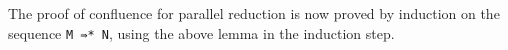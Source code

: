 \begin{fence}
\begin{code}
\AgdaSpace{}%
\AgdaSymbol{(}\AgdaSpace{}%
\AgdaSpace{}%
\AgdaSpace{}%
\AgdaSpace{}%
\AgdaSymbol{)}\<%
\\
\>[0][@{}l@{\AgdaIndent{0}}]%
\>[2]\AgdaSpace{}%
\AgdaSpace{}%
\AgdaSymbol{(}\AgdaSpace{}%
\AgdaSymbol{)}\AgdaSpace{}%
\<%
\\
\>[0]\AgdaSpace{}%
\AgdaSymbol{|}\AgdaSpace{}%
\AgdaSpace{}%
\AgdaSpace{}%
\AgdaOperator{\AgdaInductiveConstructor{,}}\AgdaSpace{}%
\AgdaSpace{}%
\AgdaSpace{}%
\AgdaOperator{\AgdaInductiveConstructor{,}}\AgdaSpace{}%
\AgdaSpace{}%
\AgdaSpace{}%
\AgdaSpace{}%
\AgdaSymbol{=}\AgdaSpace{}%
\AgdaSpace{}%
\AgdaSpace{}%
\AgdaOperator{\AgdaInductiveConstructor{,}}\AgdaSpace{}%
\AgdaSpace{}%
\AgdaSpace{}%
\AgdaSpace{}%
\AgdaSpace{}%
\AgdaSpace{}%
\AgdaSpace{}%
\AgdaSpace{}%
\AgdaOperator{\AgdaInductiveConstructor{,}}\AgdaSpace{}%
\AgdaSpace{}%
\AgdaSpace{}%
\<%
\end{code}
\end{fence}

The proof of confluence for parallel reduction is now proved by
induction on the sequence \texttt{M\ ⇛*\ N}, using the above lemma in
the induction step.

